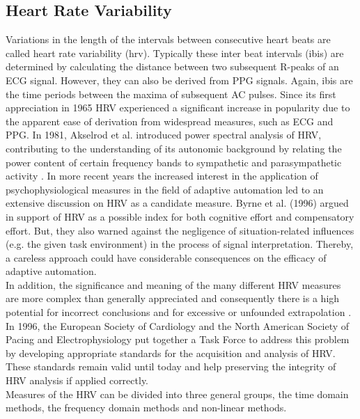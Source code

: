 \subsection{Heart Rate Variability}
Variations in the length of the intervals between consecutive heart beats are called heart rate variability (\gls{hrv}). Typically these inter beat intervals (\gls{ibi}s) are determined by calculating the distance between two subsequent R-peaks of an ECG signal. However, they can also be derived from PPG signals. Again, \gls{ibi}s are the time periods between the maxima of subsequent AC pulses. Since its first appreciation in 1965 HRV experienced a significant increase in popularity due to the apparent ease of derivation from widespread measures, such as ECG and PPG. In 1981, Akselrod et al. introduced power spectral analysis of HRV, contributing to the understanding of its autonomic background by relating the power content of certain frequency bands to sympathetic and parasympathetic activity \cite{TheEuropeanSocietyofCardiology1996}.
In more recent years the increased interest in the application of psychophysiological measures in the field of adaptive automation led to an extensive discussion on HRV as a candidate measure. Byrne et al. (1996) argued in support of HRV as a possible index for both cognitive effort and compensatory effort. But, they also warned against the negligence of situation-related influences (e.g. the given task environment) in the process of signal interpretation. Thereby, a careless approach could have considerable consequences on the efficacy of adaptive automation.\\
In addition, the significance and meaning of the many different HRV measures are more complex than generally appreciated and consequently there is a high potential for incorrect conclusions and for excessive or unfounded extrapolation \cite{TheEuropeanSocietyofCardiology1996}.
In 1996, the European Society of Cardiology and the North American Society of Pacing and Electrophysiology put together a Task Force to address this problem by developing appropriate standards for the acquisition and analysis of HRV.
These standards remain valid until today and help preserving the integrity of HRV analysis if applied correctly.\\
Measures of the HRV can be divided into three general groups, the time domain methods, the frequency domain methods and non-linear methods. 
